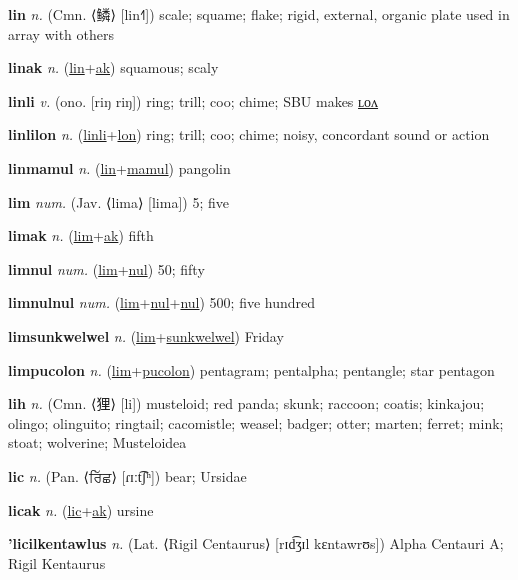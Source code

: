 \textbf{\hypertarget{lin}{lin}} \textit{n.} (Cmn. ⟨{\chinese{}鳞}⟩ [lin˧˥])
scale; squame; flake; rigid, external, organic plate used in array with others

\textbf{\hypertarget{linak}{linak}} \textit{n.} (\hyperlink{lin}{lin}+\allowbreak \hyperlink{ak}{ak})
squamous; scaly

\textbf{\hypertarget{linli}{linli}} \textit{v.} (ono. [riŋ riŋ])
ring; trill; coo; chime; SBU makes \hyperlink{linlilon}{ʟᴏᴧ}

\textbf{\hypertarget{linlilon}{linlilon}} \textit{n.} (\hyperlink{linli}{linli}+\allowbreak \hyperlink{lon}{lon})
ring; trill; coo; chime; noisy, concordant sound or action

\textbf{\hypertarget{linmamul}{linmamul}} \textit{n.} (\hyperlink{lin}{lin}+\allowbreak \hyperlink{mamul}{mamul})
pangolin

\textbf{\hypertarget{lim}{lim}} \textit{num.} (Jav. ⟨lima⟩ [lima])
5; five

\textbf{\hypertarget{limak}{limak}} \textit{n.} (\hyperlink{lim}{lim}+\allowbreak \hyperlink{ak}{ak})
fifth

\textbf{\hypertarget{limnul}{limnul}} \textit{num.} (\hyperlink{lim}{lim}+\allowbreak \hyperlink{nul}{nul})
50; fifty

\textbf{\hypertarget{limnulnul}{limnulnul}} \textit{num.} (\hyperlink{lim}{lim}+\allowbreak \hyperlink{nul}{nul}+\allowbreak \hyperlink{nul}{nul})
500; five hundred

\textbf{\hypertarget{limsunkwelwel}{limsunkwelwel}} \textit{n.} (\hyperlink{lim}{lim}+\allowbreak \hyperlink{sunkwelwel}{sunkwelwel})
Friday

\textbf{\hypertarget{limpucolon}{limpucolon}} \textit{n.} (\hyperlink{lim}{lim}+\allowbreak \hyperlink{pucolon}{pucolon})
pentagram; pentalpha; pentangle; star pentagon

\textbf{\hypertarget{lih}{lih}} \textit{n.} (Cmn. ⟨{\chinese{}狸}⟩ [li])
musteloid; red panda; skunk; raccoon; coatis; kinkajou; olingo; olinguito; ringtail; cacomistle; weasel; badger; otter; marten; ferret; mink; stoat; wolverine; Musteloidea

\textbf{\hypertarget{lic}{lic}} \textit{n.} (Pan. ⟨{\gurmukhi{}ਰਿੱਛ}⟩ [ɾɪːt͡ʃʰ])
bear; Ursidae

\textbf{\hypertarget{licak}{licak}} \textit{n.} (\hyperlink{lic}{lic}+\allowbreak \hyperlink{ak}{ak})
ursine

\textbf{\hypertarget{'licilkentawlus}{'licilkentawlus}} \textit{n.} (Lat. ⟨Rigil Centaurus⟩ [rɪd͡ʒɪl kɛntawrʊs])
Alpha Centauri A; Rigil Kentaurus

